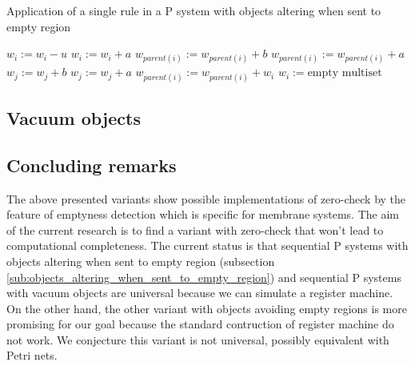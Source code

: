 \begin{algorithm}
  \caption{Application of a single rule in a P system with objects altering when sent to empty region}\label{alg:application_of_a_rule_in_a_p_system_with_objects_altering_when_sent_to_empty_region}
  \begin{algorithmic}[1]
      \State $w_i := w_i - u$
        \State $w_i := w_i + a$
      \EndFor
          \State $w_{parent(i)} := w_{parent(i)} + b$
        \Else
          \State $w_{parent(i)} := w_{parent(i)} + a$
        \EndIf
      \EndFor
          \State $w_j := w_j + b$
        \Else
          \State $w_j := w_j + a$
        \EndIf
      \EndFor
        \State $w_{parent(i)} := w_{parent(i)} + w_i$
        \State $w_i := \text{empty multiset}$
      \EndIf
    \EndProcedure
  \end{algorithmic}
\end{algorithm}


\subsection{Vacuum objects} %
\label{sub:vacuum_objects}


\subsection{Concluding remarks} %
\label{sub:concluding_remarks_of_emptyness_detection}

The above presented variants show possible implementations of zero-check by the feature of emptyness detection which is specific for membrane systems. The aim of the current research is to find a variant with zero-check that won't lead to computational completeness. The current status is that sequential P systems with objects altering when sent to empty region (subsection \ref{sub:objects_altering_when_sent_to_empty_region}) and sequential P systems with vacuum objects are universal because we can simulate a register machine. On the other hand, the other variant with objects avoiding empty regions is more promising for our goal because the standard contruction of register machine do not work. We conjecture this variant is not universal, possibly equivalent with Petri nets.

